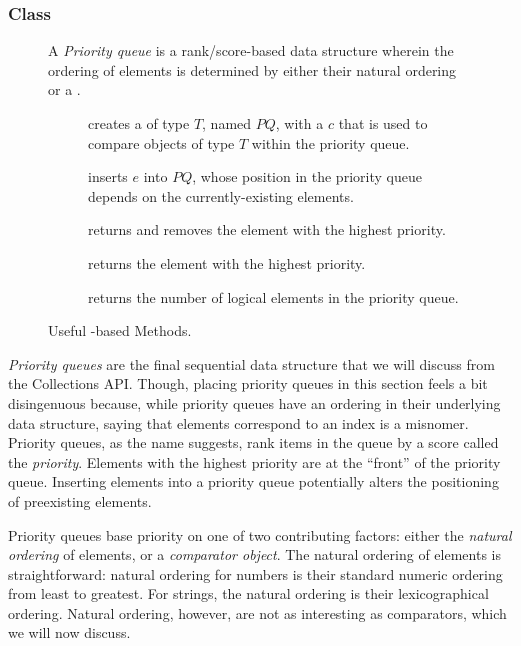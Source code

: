 \subsubsection*{ Class}
\begin{figure}[tp]
  \small
  \begin{tcolorbox}[title=Java PriorityQueue]
    A \emph{Priority queue} is a rank/score-based data structure wherein the ordering of elements is determined by either their natural ordering or a .
    \vspace{2ex}
  \begin{description}
    \item [] creates a  of type $T$, named $PQ$, with a  $c$ that is used to compare objects of type $T$ within the priority queue.
     \item [] inserts $e$ into $PQ$, whose position in the priority queue depends on the currently-existing elements.
     \item [] returns and removes the element with the highest priority.
     \item [] returns the element with the highest priority.
    \item [] returns the number of logical elements in the priority queue.
  \end{description}
\end{tcolorbox}
  \caption{Useful -based Methods.}
  \label{fig:priorityqueues}
\end{figure}

\emph{Priority queues} are the final sequential data structure that we will discuss from the Collections API\@. 
Though, placing priority queues in this section feels a bit disingenuous because, while priority queues have an ordering in their underlying data structure, saying that elements correspond to an index is a misnomer. 
Priority queues, as the name suggests, rank items in the queue by a score called the \emph{priority}. 
Elements with the highest priority are at the ``front'' of the priority queue. 
Inserting elements into a priority queue potentially alters the positioning of preexisting elements.

Priority queues base priority on one of two contributing factors: either the \emph{natural ordering} of elements, or a \emph{comparator object}. 
The natural ordering of elements is straightforward: natural ordering for numbers is their standard numeric ordering from least to greatest. 
For strings, the natural ordering is their lexicographical ordering. 
Natural ordering, however, are not as interesting as comparators, which we will now discuss.

